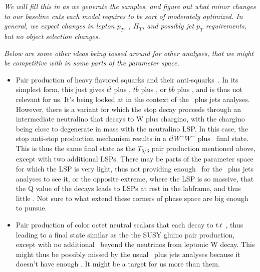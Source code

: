 {\it We will fill this in as we generate the samples, and figure out what minor changes to our baseline cuts each model
requires to be sort of moderately optimized. In general, we expect changes in lepton $p_T$, \met, $H_T$, and possibly
jet $p_T$ requirements, but no object selection changes.}

{\it Below are some other ideas being tossed around for other analyses, that we might be competitive with in
some parts of the parameter space.}

\begin{itemize}
\item Pair production of heavy flavored squarks and their anti-squarks~\cite{toro1}. In its simplest form, this just gives 
$t\bar{t}$ plus \met , $t\bar{b}$ plus \met , or $b\bar{b}$ plus \met , and is thus not relevant for us. It's being looked at
in the context of the \met\ plus jets analyses. 
However, there is a variant for which the stop decay proceeds through an intermediate neutralino that decays to W plus
chargino, with the chargino being close to degenerate in mass with the neutralino LSP. In this case,
the stop anti-stop production mechanism results in a $t\bar{t}W^+W^-$ plus \met\ final state. This is thus the same 
final state as the $T_{5/3}$ pair production mentioned above, except with two additional LSPs. 
There may be parts of the parameter space for which the LSP is very light, thus not providing enough \met\ for the 
\met\ plus jets analyses to see it, or the opposite extreme, where the LSP is so massive, that the Q value of the decays
leads to LSPs at rest in the labframe, and thus little \met . Not sure to what extend these corners of phase space are
big enough to pursue.
\item Pair production of color octet neutral scalars that each decay to $t\bar{}t$~\cite{toro2}, thus leading to a final state
similar as the the SUSY gluino pair production, except with no additional \met\ beyond the neutrinos from leptonic
W decay. This might thus be possibly missed by the usual \met\ plus jets analyses because it doesn't have enough \met .
It might be a target for us more than them.
\end{itemize}
